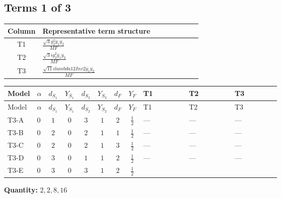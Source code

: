 \documentclass[8pt]{article}
\begin{document}
\begin{landscape}
\subsection*{Terms 1 of 3}
\begin{center}
\begin{tabular}{@{}c >{\raggedright\arraybackslash}p{0.82\linewidth}@{}}
\toprule
Column & Representative term structure \\
\midrule
T1 & \(\displaystyle \frac{\sqrt{3} g_{2}^{2} \overline{y_{1}} \overline{y_{2}}}{MF}\) \\
\midrule
T2 & \(\displaystyle \frac{\sqrt{3} i g_{2}^{2} \overline{y_{1}} \overline{y_{2}}}{MF}\) \\
\midrule
T3 & \(\displaystyle \frac{\sqrt{11} i lambda12Inv2 \overline{y_{1}} \overline{y_{2}}}{MF}\) \\
\midrule
\bottomrule
\end{tabular}
\end{center}
\smallskip
\tiny
\begin{longtable}{@{}llcccccc >{\raggedright\arraybackslash}p{0.21\linewidth} >{\raggedright\arraybackslash}p{0.21\linewidth} >{\raggedright\arraybackslash}p{0.21\linewidth}@{}}
\toprule
Model & $\alpha$ & $d_{S_1}$ & $Y_{S_1}$ & $d_{S_2}$ & $Y_{S_2}$ & $d_F$ & $Y_F$ & T1 & T2 & T3 \\
\midrule
\endfirsthead
\toprule
Model & $\alpha$ & $d_{S_1}$ & $Y_{S_1}$ & $d_{S_2}$ & $Y_{S_2}$ & $d_F$ & $Y_F$ & T1 & T2 & T3 \\
\midrule
\endhead
T3-A & $0$ & $1$ & $0$ & $3$ & $1$ & $2$ & $\frac{1}{2}$ & --- & --- & --- \\
\midrule
T3-B & $0$ & $2$ & $0$ & $2$ & $1$ & $1$ & $\frac{1}{2}$ & --- & --- & --- \\
\midrule
T3-C & $0$ & $2$ & $0$ & $2$ & $1$ & $3$ & $\frac{1}{2}$ & --- & --- & --- \\
\midrule
T3-D & $0$ & $3$ & $0$ & $1$ & $1$ & $2$ & $\frac{1}{2}$ & --- & --- & --- \\
\midrule
T3-E & $0$ & $3$ & $0$ & $3$ & $1$ & $2$ & $\frac{1}{2}$ & \scriptsize\adjustbox{max width=\linewidth}{$\begin{gathered} \frac{\sqrt{3} g_{2}^{2} \overline{y_{1}} \overline{y_{2}}}{6 MF}\end{gathered}$} & \scriptsize\adjustbox{max width=\linewidth}{$\begin{gathered} - \frac{49 \sqrt{3} i g_{2}^{2} \overline{y_{1}} \overline{y_{2}}}{24 MF}\end{gathered}$} & \scriptsize\adjustbox{max width=\linewidth}{$\begin{gathered} - \frac{3 \sqrt{11} i lambda12Inv2 \overline{y_{1}} \overline{y_{2}}}{22 MF}\end{gathered}$} \\
\midrule
\bottomrule
\end{longtable}
\clearpage
\noindent\textbf{Quantity: }$\mathrm{2,2,8,16}$\par\smallskip

\end{landscape}
\end{document}
